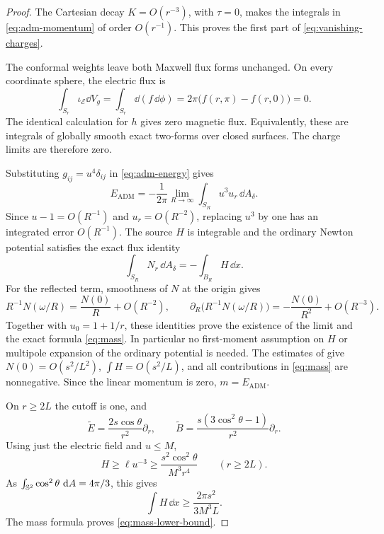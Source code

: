 \begin{proof}
The Cartesian decay \(K=O(r^{-3})\), with \(\tau=0\), makes the integrals
in \eqref{eq:adm-momentum} of order \(O(r^{-1})\). This proves the first
part of \eqref{eq:vanishing-charges}.

The conformal weights leave both Maxwell flux forms unchanged. On every
coordinate sphere, the electric flux is
\[
 \int_{S_r}\iota_{\mathcal E}\dd V_g
 =\int_{S_r}\dd(f\,\dd\phi)
 =2\pi\bigl(f(r,\pi)-f(r,0)\bigr)=0.
\]
The identical calculation for \(h\) gives zero magnetic flux. Equivalently,
these are integrals of globally smooth exact two-forms over closed
surfaces. The charge limits are therefore zero.

Substituting \(g_{ij}=u^4\delta_{ij}\) in \eqref{eq:adm-energy} gives
\begin{equation}\label{eq:conformal-mass-flux}
 E_{\mathrm{ADM}}
 =-\frac1{2\pi}\lim_{R\to\infty}
   \int_{S_R}u^3u_r\,\dd A_\delta.
\end{equation}
Since \(u-1=O(R^{-1})\) and \(u_r=O(R^{-2})\), replacing \(u^3\) by one
has an integrated error \(O(R^{-1})\). The source \(H\) is integrable and
the ordinary Newton potential satisfies the exact flux identity
\[
 \int_{S_R}N_r\,\dd A_\delta=-\int_{B_R}H\,\dd x.
\]
For the reflected term, smoothness of \(N\) at the origin gives
\[
 R^{-1}N(\omega/R)=\frac{N(0)}{R}+O(R^{-2}),
 \qquad
 \partial_R\bigl(R^{-1}N(\omega/R)\bigr)
       =-\frac{N(0)}{R^2}+O(R^{-3}).
\]
Together with \(u_0=1+1/r\), these identities prove the existence of the
limit and the exact formula \eqref{eq:mass}. In particular no first-moment
assumption on \(H\) or multipole expansion of the ordinary potential is
needed. The estimates of  give
\(N(0)=O(s^2/L^2)\), \(\int H=O(s^2/L)\), and all contributions in
\eqref{eq:mass} are nonnegative. Since the linear momentum is zero,
\(m=E_{\mathrm{ADM}}\).

On \(r\ge2L\) the cutoff is one, and
\begin{equation}\label{eq:radial-tails}
 \widetilde E=\frac{2s\cos\theta}{r^2}\partial_r,
 \qquad
 \widetilde B=\frac{s(3\cos^2\theta-1)}{r^2}\partial_r.
\end{equation}
Using just the electric field and \(u\le M\),
\[
 H\ge\ell u^{-3}\ge\frac{s^2\cos^2\theta}{M^3r^4}
 \qquad(r\ge2L).
\]
As \(\int_{\mathbb S^2}\cos^2\theta\,\mathop{}\!\mathrm d A=4\pi/3\), this gives
\[
 \int H\,\dd x\ge\frac{2\pi s^2}{3M^3L}.
\]
The mass formula proves \eqref{eq:mass-lower-bound}.


\end{proof}
